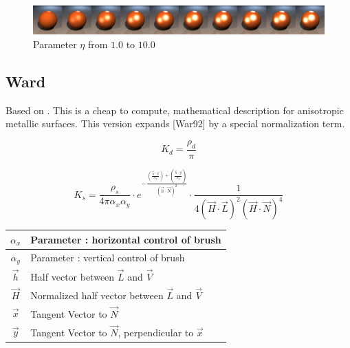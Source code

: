 \documentclass[11pt,a4paper]{article}
\begin{document}
\begin{figure}[H]

\includegraphics[width=\textwidth]{ctfresnelcomplete.png}
\caption{Parameter $\eta$ from $1.0$ to $10.0$}
\end{figure}


\newpage
\subsection{Ward}
Based on \cite{GMD10}. This is a cheap to compute, mathematical description for anisotropic metallic surfaces. This version expands [War92] by a special normalization term. 

\begin{equation}
K_d = \frac{\rho_d}{\pi}
\end{equation}

\begin{equation}
K_s = \frac{\rho_s}{4 \pi \alpha_x \alpha_y } 
\cdot e^
{
- \frac{(\frac{\vec{h} \cdot \vec{x}}{\alpha_x})+(\frac{\vec{h} \cdot \vec{y}}{\alpha_y})}
{(\vec{h} \cdot \vec{N})^2}
}
\cdot 
\frac{1}{4 (\vec{H} \cdot \vec{L})^2 (\vec{H} \cdot \vec{N})^4}
\end{equation}

\begin{table}[H]
\begin{tabular}{| c | l |}
\hline
$\alpha_x$ & Parameter : horizontal control of brush\\ \hline
$\alpha_y$ & Parameter : vertical control of brush \\ \hline
$\vec{h}$ & Half vector between $\vec{L}$ and $\vec{V}$ \\ \hline
$\vec{H}$ & Normalized half vector between $\vec{L}$ and $\vec{V}$ \\ \hline
$\vec{x}$ & Tangent Vector to $\vec{N}$ \\ \hline
$\vec{y}$ & Tangent Vector to $\vec{N}$, perpendicular to $\vec{x}$ \\ \hline
\end{tabular}
\end{table}
\end{document}

